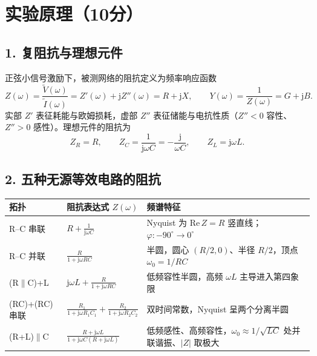 \documentclass[12pt,a4paper]{ctexart}
\begin{document}
\section*{实验原理（10分）}

\subsection*{1. 复阻抗与理想元件}
正弦小信号激励下，被测网络的阻抗定义为频率响应函数
\begin{equation}
    Z(\omega)=\frac{\widetilde{V}(\omega)}{\widetilde{I}(\omega)}=Z'(\omega)+\mathrm{j}Z''(\omega)=R+\mathrm{j}X,
    \qquad
    Y(\omega)=\frac{1}{Z(\omega)}=G+\mathrm{j}B .
\end{equation}
实部 $Z'$ 表征耗能与欧姆损耗，虚部 $Z''$ 表征储能与电抗性质（$Z''<0$ 容性、$Z''>0$ 感性）。理想元件的阻抗为
\begin{equation}
    Z_R=R,\qquad Z_C=\frac{1}{\mathrm{j}\omega C}=-\frac{\mathrm{j}}{\omega C},\qquad Z_L=\mathrm{j}\omega L .
\end{equation}

\subsection*{2. 五种无源等效电路的阻抗}

\begin{table}[h]
\centering\footnotesize
\setlength{\tabcolsep}{4pt}
\begin{tabular}{@{}p{2.4cm}|p{5.0cm}|p{5.6cm}@{}}
\hline
拓扑 & 阻抗表达式 $Z(\omega)$ & 频谱特征 \\
\hline
R--C 串联 & $R+\displaystyle\frac{1}{\mathrm{j}\omega C}$ & Nyquist 为 $\mathrm{Re}\,Z=R$ 竖直线；$\varphi:-90^\circ\to0^\circ$ \\
R--C 并联 & $\displaystyle\frac{R}{1+\mathrm{j}\omega R C}$ & 半圆，圆心 $(R/2,0)$、半径 $R/2$，顶点 $\omega_0=1/RC$ \\
(R$\parallel$C)+L & $\mathrm{j}\omega L+\displaystyle\frac{R}{1+\mathrm{j}\omega R C}$ & 低频容性半圆，高频 $\omega L$ 主导进入第四象限 \\
(RC)+(RC) 串联 & $\displaystyle\frac{R_1}{1+\mathrm{j}\omega R_1C_1}+\displaystyle\frac{R_2}{1+\mathrm{j}\omega R_2C_2}$ & 双时间常数，Nyquist 呈两个分离半圆 \\
(R+L)$\parallel$C & $\displaystyle\frac{R+\mathrm{j}\omega L}{1+\mathrm{j}\omega C(R+\mathrm{j}\omega L)}$ & 低频感性、高频容性，$\omega_0\approx1/\sqrt{LC}$ 处并联谐振、$|Z|$ 取极大 \\
\hline
\end{tabular}
\end{table}
\end{document}
